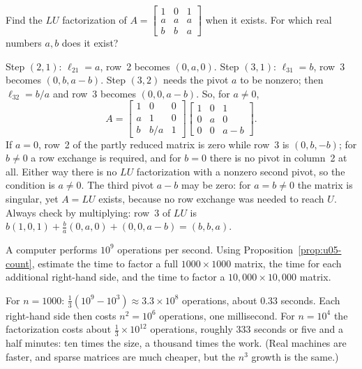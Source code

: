 \begin{exercise}\label{ex:u05-ab}
Find the $LU$ factorization of $A=\begin{bmatrix} 1&0&1\\ a&a&a\\ b&b&a\end{bmatrix}$ when it
exists. For which real numbers $a,b$ does it exist?
\end{exercise}
\begin{solution}
Step $(2,1)$: $\ell_{21}=a$, row~2 becomes $(0,a,0)$. Step $(3,1)$: $\ell_{31}=b$, row~3
becomes $(0,b,a-b)$. Step $(3,2)$ needs the pivot $a$ to be nonzero; then $\ell_{32}=b/a$ and
row~3 becomes $(0,0,a-b)$. So, for $a\neq0$,
\[
  A=\begin{bmatrix} 1&0&0\\ a&1&0\\ b&b/a&1\end{bmatrix}
    \begin{bmatrix} 1&0&1\\ 0&a&0\\ 0&0&a-b\end{bmatrix}.
\]
If $a=0$, row~2 of the partly reduced matrix is zero while row~3 is $(0,b,-b)$; for $b\neq0$
a row exchange is required, and for $b=0$ there is no pivot in column~2 at all. Either way
there is no $LU$ factorization with a nonzero second pivot, so the condition is $a\neq0$.
The third pivot $a-b$ may be zero: for $a=b\neq0$ the matrix is singular, yet $A=LU$
exists, because no row exchange was needed to reach $U$. Always check by multiplying: row~3
of $LU$ is $b(1,0,1)+\tfrac ba(0,a,0)+(0,0,a-b)=(b,b,a)$.
\end{solution}

\begin{exercise}\label{ex:u05-time}
A computer performs $10^9$ operations per second. Using Proposition~\ref{prop:u05-count},
estimate the time to factor a full $1000\times1000$ matrix, the time for each additional
right-hand side, and the time to factor a $10{,}000\times10{,}000$ matrix.
\end{exercise}
\begin{solution}
For $n=1000$: $\tfrac13(10^9-10^3)\approx3.3\times10^8$ operations, about $0.33$ seconds.
Each right-hand side then costs $n^2=10^6$ operations, one millisecond. For $n=10^4$ the
factorization costs about $\tfrac13\times10^{12}$ operations, roughly $333$ seconds or five
and a half minutes: ten times the size, a thousand times the work. (Real machines are faster,
and sparse matrices are much cheaper, but the $n^3$ growth is the same.)
\end{solution}
